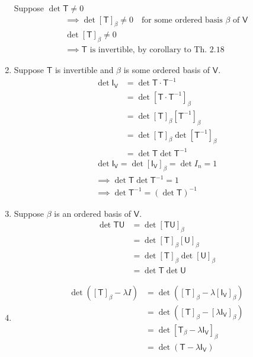 \begin{enumerate}
Suppose $\det{\mathsf{T}}\neq 0$ 
\begin{gather}
\implies \det[\mathsf{T}]_\beta \neq 0 \quad \text{for some ordered
  basis } \beta \text{ of } \mathsf{V}\\
\det{[\mathsf{T}]_\beta} \neq  0\\
\implies \mathsf{T} \text{ is invertible, by corollary to Th. 2.18}
\end{gather}
\item Suppose $\mathsf{T}$ is invertible and $\beta$ is some ordered
  basis of $\mathsf{V}$.
\begin{align}
\det{\mathsf{I}_\mathsf{V}} &= \det{\mathsf{T}\cdot\mathsf{T}^{-1}}\\
&= \det{[\mathsf{T}\cdot\mathsf{T}^{-1}]_\beta}\\
&= \det{[\mathsf{T}]_\beta[\mathsf{T}^{-1}]_\beta}\\
&= \det{[\mathsf{T}]_\beta}\det{[\mathsf{T}^{-1}]_\beta}\\
&= \det{\mathsf{T}}\det{\mathsf{T}^{-1}}
\end{align}
\begin{gather}
\det{\mathsf{I}_\mathsf{V}} = \det{[\mathsf{I}_\mathsf{V}]_\beta} =
  \det{I_n} =1\\
\implies \det{\mathsf{T}} \det{\mathsf{T}^{-1}} = 1\\
\implies \det{\mathsf{T}^{-1}} = (\det{\mathsf{T}})^{-1}
\end{gather}
\item Suppose $\beta$ is an ordered basis of $\mathsf{V}$.
\begin{align}
\det{\mathsf{TU}} &= \det{[\mathsf{TU}]_\beta}\\
&= \det{[\mathsf{T}]_\beta[\mathsf{U}]_\beta}\\
&= \det{[\mathsf{T}]_\beta}\det{[\mathsf{U}]_\beta}\\
&= \det{\mathsf{T}}\det{\mathsf{U}}
\end{align}
\item 
\begin{align}
\det{([\mathsf{T}]_\beta -\lambda I)} &= \det{([\mathsf{T}]_\beta
  -\lambda[\mathsf{I}_\mathsf{V}]_\beta)}\\
&= \det{([\mathsf{T}]_\beta
  -[\lambda\mathsf{I}_\mathsf{V}]_\beta)}\\
&= \det{[\mathsf{T}_\beta -\lambda \mathsf{I}_\mathsf{V}]_\beta}\\
&= \det{(\mathsf{T}-\lambda \mathsf{I}_\mathsf{V})}
\end{align}
\end{enumerate}
